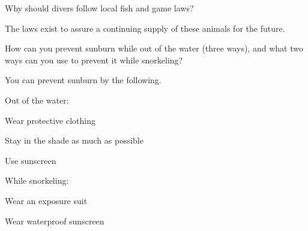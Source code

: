 	\begin{qanda}
		\begin{question}
Why should divers follow local fish and game laws?
		\end{question}

		\begin{answer}
The laws exist to assure a continuing supply of these animals for the future.
		\end{answer}
	\end{qanda}

	\begin{qanda}
		\begin{question}
How can you prevent sunburn while out of the water (three ways), and what two ways can you use to prevent it while snorkeling?
		\end{question}

		\begin{answer}
You can prevent sunburn by the following.

\noindent Out of the water:
			\begin{numberedlist}
				\item Wear protective clothing
				\item Stay in the shade as much as possible
				\item Use sunscreen
			\end{numberedlist}

\noindent While snorkeling:
			\begin{nospacenumberedlist}
				\item Wear an exposure suit
				\item Wear waterproof sunscreen
			\end{nospacenumberedlist}
		\end{answer}
	\end{qanda}

